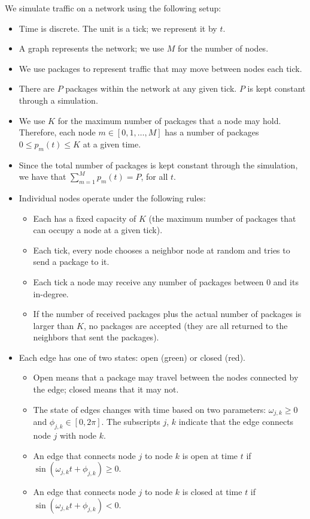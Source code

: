 \documentclass[12pt]{article}
\begin{document}
We simulate traffic on a network using the following setup:
\begin{itemize}
  \item Time is discrete. The unit is a tick; we represent it by $t$.
  \item A graph represents the network; we use $M$ for the number of nodes.
  \item We use packages to represent traffic that may move between nodes each tick. 
  \item There are $P$ packages within the network at any given tick. $P$ is kept constant through a simulation.
  \item We use $K$ for the maximum number of packages that a node may hold. 
    Therefore, each node $m \in [0,1,\ldots,M]$ has a number of packages $0 \le p_m(t) \le K$ at a given time.    
  \item Since the total number of packages is kept constant through the simulation, we have that $\sum_{m=1}^M p_m(t) = P$, for all $t$.
  \item Individual nodes operate under the following rules:
  \begin{itemize}
    \item Each has a fixed capacity of $K$ (the maximum number of packages that can occupy a node at a given tick).
    \item Each tick, every node chooses a neighbor node at random and tries to send a package to it.
    \item Each tick a node may receive any number of packages between 0 and its in-degree.
    \item If the number of received packages plus the actual number of packages is larger than $K$, no packages are accepted (they are all returned to the neighbors that sent the packages).
  \end{itemize}
  \item Each edge has one of two states: open (green) or closed (red).
  \begin{itemize}
    \item Open means that a package may travel between the nodes connected by the edge; closed means that it may not.
    \item The state of edges changes with time based on two parameters: $\omega_{j,k} \ge 0$ and $\phi_{j,k} \in [0, 2 \pi]$.
      The subscripts $j$, $k$ indicate that the edge connects node $j$ with node $k$.
    \item An edge that connects node $j$ to node $k$ is open at time $t$ if $\sin(\omega_{j,k} t + \phi_{j,k}) \ge 0$.
    \item An edge that connects node $j$ to node $k$ is closed at time $t$ if $\sin(\omega_{j,k} t + \phi_{j,k}) < 0$.
  \end{itemize}
\end{itemize}
\end{document}
